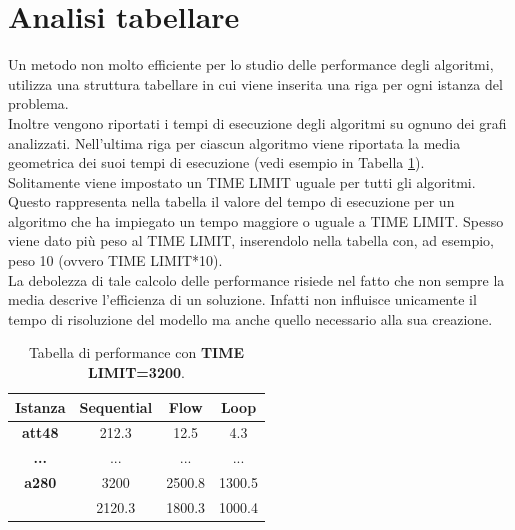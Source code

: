 \section{Analisi tabellare}
Un metodo non molto efficiente per lo studio delle performance degli algoritmi, utilizza una struttura tabellare in cui viene inserita una riga per ogni istanza del problema.\\ Inoltre vengono riportati i tempi di esecuzione degli algoritmi su ognuno dei grafi analizzati. Nell'ultima riga per ciascun algoritmo viene riportata la media geometrica dei suoi tempi di esecuzione (vedi esempio in Tabella \ref{result_table}).\\
Solitamente viene impostato un TIME LIMIT uguale per tutti gli algoritmi. Questo rappresenta nella tabella il valore del tempo di esecuzione per un algoritmo che ha impiegato un tempo maggiore o uguale a TIME LIMIT. Spesso viene dato più peso al TIME LIMIT, inserendolo nella tabella con, ad esempio, peso 10 (ovvero TIME LIMIT*10).\\ La debolezza di tale calcolo delle performance risiede nel fatto che non sempre la media descrive  l'efficienza di un soluzione. Infatti non influisce unicamente il tempo di risoluzione del modello ma anche quello necessario alla sua creazione. 

\begin{table}[h]
\centering
\begin{tabular}{|c|c|c|c|}
\multicolumn{1}{c}{\textbf{Istanza}} & \multicolumn{1}{c}{\textbf{Sequential}} & \multicolumn{1}{c}{\textbf{Flow}} &
\multicolumn{1}{c}{\textbf{Loop}}\\
\hline
\textbf{att48} & {212.3} & {12.5} & {4.3}\\
\hline
{\textbf{...}} & {...} & {...} & {...}\\
\hline
\textbf{a280} & {3200} & {2500.8} & {1300.5}\\
\hline
\hline
\multicolumn{1}{c}{} & \multicolumn{1}{c}{2120.3} & \multicolumn{1}{c}{1800.3}& \multicolumn{1}{c}{1000.4}\\
\end{tabular}
\caption{\footnotesize{Tabella di performance con \textbf{TIME LIMIT=3200}.}}\label{result_table}
\end{table}

